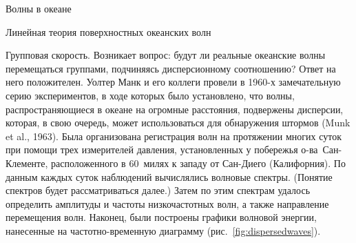\begin{chapter}{Волны в океане}
\begin{section}{Линейная теория поверхностных океанских волн}
\begin{paragraph}{Групповая скорость.}
Возникает вопрос: будут ли реальные океанские волны перемещаться группами,
подчиняясь дисперсионному соотношению? Ответ на него положителен. Уолтер Манк
и его коллеги провели в 1960-х замечательную серию экспериментов, в ходе
которых было установлено, что волны, распространяющиеся в океане на огромные
расстояния, подвержены дисперсии, которая, в свою очередь, может 
использоваться для обнаружения штормов (Munk et al., 1963). 
Была организована регистрация волн на протяжении многих суток при помощи 
трех измерителей давления, установленных у побережья о-ва~Сан-Клементе, 
расположенного в 60~милях
к западу от Сан-Диего (Калифорния). По данным каждых суток наблюдений
вычислялись волновые спектры. (Понятие спектров будет рассматриваться далее.)
Затем по этим спектрам удалось определить амплитуды и частоты
низкочастотных волн, а также направление перемещения волн.
Наконец, были построены графики волновой энергии, нанесенные на 
частотно-временную диаграмму (рис.~\ref{fig:dispersedwaves}).
%


\end{paragraph}
\end{section}
\end{chapter}
